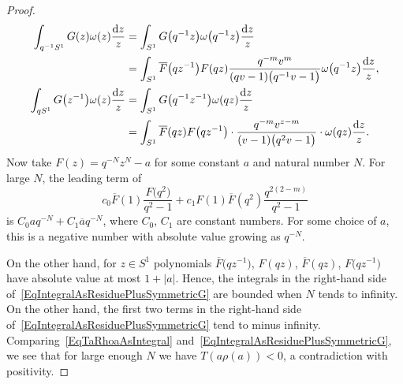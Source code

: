 \documentclass[pdftex]{sigma}
\newcommand{\ovl}{\overline}
\numberwithin{equation}{section}
\theoremstyle{definition}
\begin{document}
\begin{proof}
\begin{align*}
 \int_{q^{-1}S^1}G(z)\omega(z)\frac{{\rm d}z}{z}&=\int_{S^1}G\bigl(q^{-1}z\bigr)\omega\bigl(q^{-1}z\bigr)\frac{{\rm d}z}{z}\\
 &=\int_{S^1}\ovl{F}\bigl(qz^{-1}\bigr)F(qz)\frac{q^{-m}v^m}{(qv-1)\bigl(q^{-1}v-1\bigr)}\omega\bigl(q^{-1}z\bigr)\frac{{\rm d}z}{z},
\\
 \int_{qS^1}G\bigl(z^{-1}\bigr)\omega(z)\frac{{\rm d}z}{z}&=\int_{S^1}G\bigl(q^{-1}z^{-1}\bigr)\omega(qz)\frac{{\rm d}z}{z}\\
 &=\int_{S^1}\ovl{F}(qz)F\bigl(q z^{-1}\bigr)\cdot \frac{q^{-m}v^{z-m}}{(v-1)\bigl(q^2v-1\bigr)}\cdot \omega(qz)\frac{{\rm d}z}{z}.
 \end{align*}
Now take $F(z)=q^{-N}z^N-a$ for some constant $a$ and natural number $N$. For large $N$, the leading term of
\[c_0\ovl{F}(1)\frac{F\bigl(q^2\bigr)}{q^2-1}+c_1F(1)\ovl{F}(q^{2})\frac{q^{2(2-m)}}{q^2-1}\] is $C_0aq^{-N}+C_1\ovl{a}q^{-N}$, where $C_0$, $C_1$ are constant numbers. For some choice of $a$, this is a negative number with absolute value growing as $q^{-N}$.

On the other hand, for $z\in S^1$ polynomials $\ovl{F}\bigl(qz^{-1}\bigr)$, $F(qz)$, $\ovl{F}(qz)$, $F\bigl(qz^{-1}\bigr)$ have absolute value at most $1+\lvert a\rvert$. Hence, the integrals in the right-hand side of~\eqref{EqIntegralAsResiduePlusSymmetricG} are bounded when $N$ tends to infinity. On the other hand, the first two terms in the right-hand side of~\eqref{EqIntegralAsResiduePlusSymmetricG} tend to minus infinity. Comparing~\eqref{EqTaRhoaAsIntegral} and~\eqref{EqIntegralAsResiduePlusSymmetricG}, we see that for large enough $N$ we have $T(a\rho(a))<0$, a contradiction with positivity.
 \end{proof}
\end{document}
